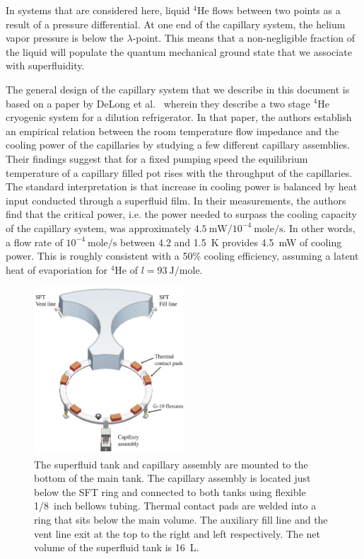 \documentclass[
12pt, %
letterpaper, %
oneside, %
headinclude, footinclude, %
BCOR5mm, %
]{scrartcl}
\newcommand{\he}{$^4\mathrm{He}$ }
\newcommand{\mrm}[1]{\mathrm{#1}}
\begin{document}
In systems that are considered here, liquid \he flows between two points as a result of a pressure differential. At one end of the capillary system, the helium vapor pressure is below the $\lambda$-point. This means that a non-negligible fraction of the liquid will populate the quantum mechanical ground state that we associate with superfluidity.

The  general design of the capillary system that we describe in this document is based on a paper by DeLong et al.\ \cite{Delong1970} wherein they describe a two stage \he cryogenic system for a dilution refrigerator. In that paper, the authors establish an empirical relation between the room temperature flow impedance and the cooling power of the capillaries by studying a few different capillary assemblies. Their findings 	suggest that for a fixed pumping speed the equilibrium temperature of a capillary filled pot rises with the throughput of the capillaries. The standard interpretation is that increase in cooling power is balanced by heat input conducted through a superfluid film. In their measurements, the authors find that the critical power, i.e. the power needed to surpass the cooling capacity of the capillary system, was approximately $4.5 \:\mrm{mW}/10^{-4} \:\mrm{mole/s}$. In other words, a flow rate of $10^{-4} \:\mrm{mole/s}$ between 4.2 and 1.5~K provides 4.5~mW of cooling power. This is roughly consistent with a 50\% cooling efficiency, assuming a latent heat of evaporiation for $^4\mrm{He}$ of $l = 93 \:\mrm{J/mole}$.

\begin{figure}[t!]
\begin{center}
\includegraphics[width = 0.5\textwidth]{img/sft_capassy5.png}   
\end{center}
\caption[The superfluid tank and capillary assembly]{The superfluid
  tank and capillary assembly are mounted to the bottom of the main
  tank. The capillary assembly is located
  just below the SFT ring and connected to both tanks using flexible
  1/8~inch bellows tubing. Thermal contact pads are welded into a ring
  that sits below the main volume. The auxiliary fill line and the vent line exit at the
  top to the right and left respectively. The net volume of the
  superfluid tank is 16~L.}
\label{fig:sft_cap}
\end{figure} 
\end{document}
